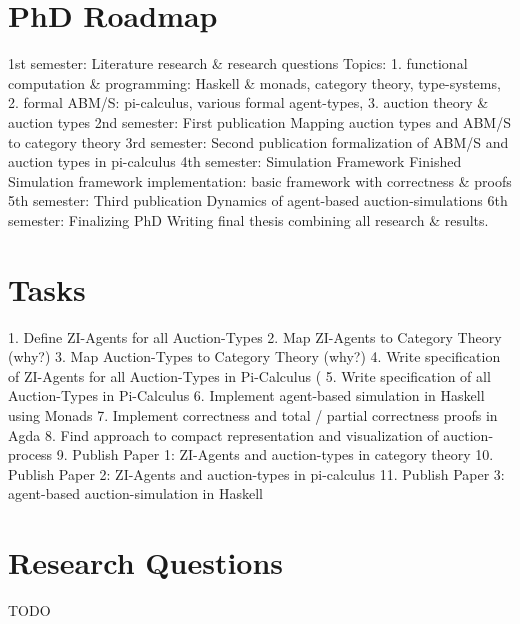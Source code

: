 \documentclass{article}
\begin{document}

\section{PhD Roadmap}
1st semester: Literature research \& research questions
Topics: 1. functional computation \& programming: Haskell \& monads, category theory, type-systems, 2. formal ABM/S: pi-calculus, various formal agent-types, 3. auction theory \& auction types
2nd semester: First publication
Mapping auction types and ABM/S to category theory
3rd semester: Second publication
formalization of ABM/S and auction types in pi-calculus 
4th semester: Simulation Framework
Finished Simulation framework implementation: basic framework with correctness \& proofs 
5th semester: Third publication
Dynamics of agent-based auction-simulations
6th semester: Finalizing PhD
Writing final thesis combining all research \& results.

\section{Tasks}
1.	Define ZI-Agents for all Auction-Types
2.	Map ZI-Agents to Category Theory (why?)
3.	Map Auction-Types to Category Theory (why?)
4.	Write specification of ZI-Agents for all Auction-Types in Pi-Calculus (
5.	Write specification of all Auction-Types in Pi-Calculus
6.	Implement agent-based simulation in Haskell using Monads
7.	Implement correctness and total / partial correctness proofs in Agda
8.	Find approach to compact representation and visualization of auction-process
9.	Publish Paper 1: ZI-Agents and auction-types in category theory
10.	Publish Paper 2: ZI-Agents and auction-types in pi-calculus
11.	Publish Paper 3: agent-based auction-simulation in Haskell

\section{Research Questions}
TODO






\end{document}
